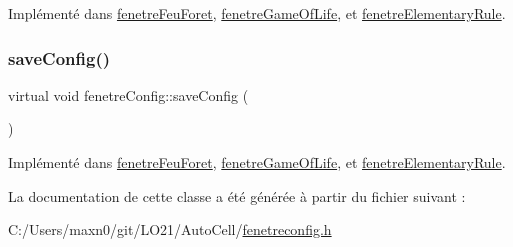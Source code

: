 Implémenté dans \mbox{\hyperlink{classfenetre_feu_foret_a0a835b46bd202080341290a7fa784c4f}{fenetre\+Feu\+Foret}}, \mbox{\hyperlink{classfenetre_game_of_life_a336a5b5e63dcddc116cc7bfc96d21dd8}{fenetre\+Game\+Of\+Life}}, et \mbox{\hyperlink{classfenetre_elementary_rule_affa7e46edbb21d5ef745957aab91daab}{fenetre\+Elementary\+Rule}}.

\mbox{\label{classfenetre_config_a4bdf35ea6efe26c3e9b1cea487931ba1}} 
\subsubsection{\texorpdfstring{save\+Config()}{saveConfig()}}
{\footnotesize\ttfamily virtual void fenetre\+Config\+::save\+Config (\begin{DoxyParamCaption}{ }\end{DoxyParamCaption})\hspace{0.3cm}{\ttfamily [pure virtual]}}



Implémenté dans \mbox{\hyperlink{classfenetre_feu_foret_a50d73cad62240b54640048cb254ddf13}{fenetre\+Feu\+Foret}}, \mbox{\hyperlink{classfenetre_game_of_life_aaa79df41aba182775dab13d42656220a}{fenetre\+Game\+Of\+Life}}, et \mbox{\hyperlink{classfenetre_elementary_rule_a36f7a8541be65aa1488fe251b0a6d277}{fenetre\+Elementary\+Rule}}.



La documentation de cette classe a été générée à partir du fichier suivant \+:\begin{DoxyCompactItemize}
\item 
C\+:/\+Users/maxn0/git/\+L\+O21/\+Auto\+Cell/\mbox{\hyperlink{fenetreconfig_8h}{fenetreconfig.\+h}}\end{DoxyCompactItemize}
